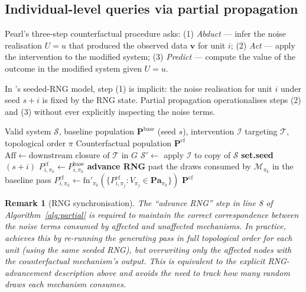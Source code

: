 \documentclass[article]{jss}
\newtheorem{remark}{Remark}
\begin{document}
\subsection{Individual-level queries via partial propagation}

Pearl's three-step counterfactual procedure \citep{pearl2009causality} asks: (1) \emph{Abduct} --- infer the noise realisation $U = u$ that produced the observed data $\mathbf{v}$ for unit $i$; (2) \emph{Act} --- apply the intervention to the modified system; (3) \emph{Predict} --- compute the value of the outcome in the modified system given $U = u$.

In 's seeded-RNG model, step (1) is implicit: the noise realisation for unit $i$ under seed $s + i$ is fixed by the RNG state. Partial propagation operationalises steps (2) and (3) without ever explicitly inspecting the noise terms.

\begin{algorithm}
\caption{Partial propagation (counterfactual)}
\label{alg:partial}
\begin{algorithmic}[1]
\Require Valid system $\mathcal{S}$, baseline population $\mathbf{P}^{\text{base}}$ (seed $s$), intervention $\mathcal{I}$ targeting $\mathcal{T}$, topological order $\pi$
\Ensure Counterfactual population $\mathbf{P}^{\text{cf}}$
\State $\text{Aff} \leftarrow \text{downstream closure of } \mathcal{T} \text{ in } G$
\State $\mathcal{S}' \leftarrow$ apply $\mathcal{I}$ to copy of $\mathcal{S}$
  \State \textbf{set.seed}$(s + i)$ 
      \State $P^{\text{cf}}_{i, \pi_k} \leftarrow P^{\text{base}}_{i, \pi_k}$ 
    \Else
      \State \textbf{advance RNG} past the draws consumed by $\mathcal{M}_{\pi_k}$ in the baseline pass 
      \State $P^{\text{cf}}_{i, \pi_k} \leftarrow \text{fn}'_{\pi_k}\!\left(\{P^{\text{cf}}_{i,\pi_j} : V_{\pi_j} \in \mathbf{Pa}_{\pi_k}\}\right)$
    \EndIf
  \EndFor
\EndFor
\State \Return $\mathbf{P}^{\text{cf}}$
\end{algorithmic}
\end{algorithm}

\begin{remark}[RNG synchronisation]
The ``advance RNG'' step in line 8 of Algorithm~\ref{alg:partial} is required to maintain the correct correspondence between the noise terms consumed by affected and unaffected mechanisms. In practice,  achieves this by re-running the generating pass in full topological order for each unit (using the same seeded RNG), but overwriting only the affected nodes with the counterfactual mechanism's output. This is equivalent to the explicit RNG-advancement description above and avoids the need to track how many random draws each mechanism consumes.
\end{remark}
\end{document}
